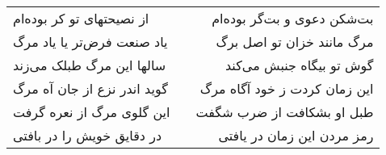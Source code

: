 \begin{center}
\begin{longtable}{l p{0.5cm} r}
\\
از نصیحتهای تو کر بوده‌ام
&&
بت‌شکن دعوی و بت‌گر بوده‌ام
\\
یاد صنعت فرض‌تر یا یاد مرگ
&&
مرگ مانند خزان تو اصل برگ
\\
سالها این مرگ طبلک می‌زند
&&
گوش تو بیگاه جنبش می‌کند
\\
گوید اندر نزع از جان آه مرگ
&&
این زمان کردت ز خود آگاه مرگ
\\
این گلوی مرگ از نعره گرفت
&&
طبل او بشکافت از ضرب شگفت
\\
در دقایق خویش را در بافتی
&&
رمز مردن این زمان در یافتی
\\
\end{longtable}
\end{center}
